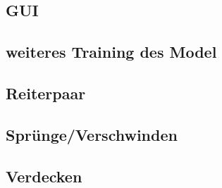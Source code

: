 \subsection{GUI}
\subsection{weiteres Training des Model}
\subsection{Reiterpaar}
\subsection{Sprünge/Verschwinden}
\subsection{Verdecken}
